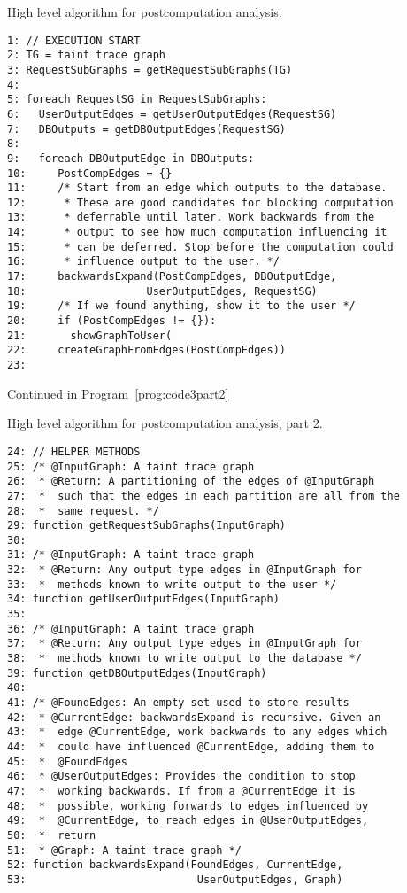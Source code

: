 \documentclass[msc,oneside]{ubcthesis}
\begin{document}
\begin{Program}
  \caption{\label{prog:code3} High level algorithm for postcomputation analysis.}
\begin{verbatim}
1: // EXECUTION START
2: TG = taint trace graph
3: RequestSubGraphs = getRequestSubGraphs(TG)
4: 
5: foreach RequestSG in RequestSubGraphs:
6:   UserOutputEdges = getUserOutputEdges(RequestSG)
7:   DBOutputs = getDBOutputEdges(RequestSG)
8:   
9:   foreach DBOutputEdge in DBOutputs:
10:     PostCompEdges = {}
11:     /* Start from an edge which outputs to the database.
12:      * These are good candidates for blocking computation 
13:      * deferrable until later. Work backwards from the 
14:      * output to see how much computation influencing it 
15:      * can be deferred. Stop before the computation could 
16:      * influence output to the user. */
17:     backwardsExpand(PostCompEdges, DBOutputEdge, 
18:                   UserOutputEdges, RequestSG)
19:     /* If we found anything, show it to the user */
20:     if (PostCompEdges != {}):
21:       showGraphToUser(
22:     createGraphFromEdges(PostCompEdges))
23:   
\end{verbatim}
Continued in Program~\ref{prog:code3part2}
\end{Program}
\begin{Program}
  \caption{\label{prog:code3part2} High level algorithm for postcomputation analysis, part 2.}
\begin{verbatim}
24: // HELPER METHODS
25: /* @InputGraph: A taint trace graph
26:  * @Return: A partitioning of the edges of @InputGraph
27:  *  such that the edges in each partition are all from the
28:  *  same request. */
29: function getRequestSubGraphs(InputGraph)
30: 
31: /* @InputGraph: A taint trace graph
32:  * @Return: Any output type edges in @InputGraph for 
33:  *  methods known to write output to the user */
34: function getUserOutputEdges(InputGraph)
35: 
36: /* @InputGraph: A taint trace graph
37:  * @Return: Any output type edges in @InputGraph for 
38:  *  methods known to write output to the database */
39: function getDBOutputEdges(InputGraph)
40: 
41: /* @FoundEdges: An empty set used to store results
42:  * @CurrentEdge: backwardsExpand is recursive. Given an 
43:  *  edge @CurrentEdge, work backwards to any edges which
44:  *  could have influenced @CurrentEdge, adding them to 
45:  *  @FoundEdges
46:  * @UserOutputEdges: Provides the condition to stop 
47:  *  working backwards. If from a @CurrentEdge it is 
48:  *  possible, working forwards to edges influenced by
49:  *  @CurrentEdge, to reach edges in @UserOutputEdges, 
50:  *  return
51:  * @Graph: A taint trace graph */
52: function backwardsExpand(FoundEdges, CurrentEdge, 
53:                           UserOutputEdges, Graph)
\end{verbatim}
\end{Program}
\end{document}

